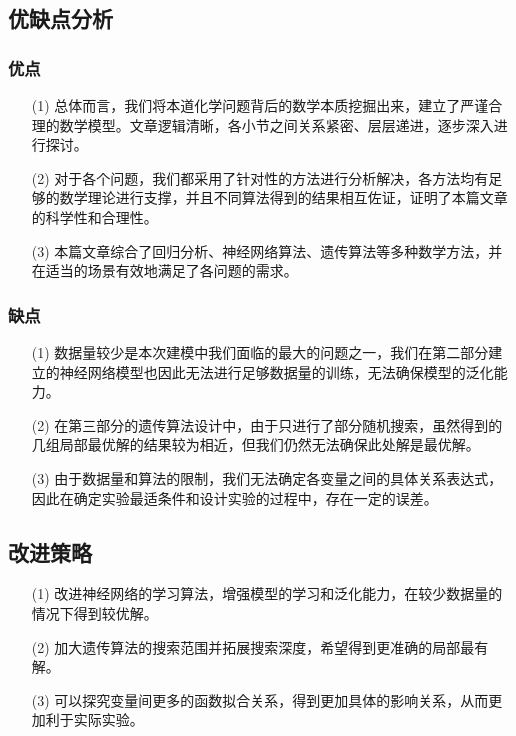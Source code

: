 \documentclass{article}
\begin{document}
	\subsection{优缺点分析}
	\subsubsection{优点}
	\begin{itemize}
		\item[(1)]总体而言，我们将本道化学问题背后的数学本质挖掘出来，建立了严谨合理的数学模型。文章逻辑清晰，各小节之间关系紧密、层层递进，逐步深入进行探讨。
		\item[(2)]对于各个问题，我们都采用了针对性的方法进行分析解决，各方法均有足够的数学理论进行支撑，并且不同算法得到的结果相互佐证，证明了本篇文章的科学性和合理性。
		\item[(3)]本篇文章综合了回归分析、神经网络算法、遗传算法等多种数学方法，并在适当的场景有效地满足了各问题的需求。
	\end{itemize}
	
	\subsubsection{缺点}
	\begin{itemize}
		\item[(1)]数据量较少是本次建模中我们面临的最大的问题之一，我们在第二部分建立的神经网络模型也因此无法进行足够数据量的训练，无法确保模型的泛化能力。
		\item[(2)]在第三部分的遗传算法设计中，由于只进行了部分随机搜索，虽然得到的几组局部最优解的结果较为相近，但我们仍然无法确保此处解是最优解。
		\item[(3)]由于数据量和算法的限制，我们无法确定各变量之间的具体关系表达式，因此在确定实验最适条件和设计实验的过程中，存在一定的误差。
	\end{itemize}

	\subsection{改进策略}
	\begin{itemize}
		\item[(1)]改进神经网络的学习算法，增强模型的学习和泛化能力，在较少数据量的情况下得到较优解。
		\item[(2)]加大遗传算法的搜索范围并拓展搜索深度，希望得到更准确的局部最有解。
		\item[(3)]可以探究变量间更多的函数拟合关系，得到更加具体的影响关系，从而更加利于实际实验。
	\end{itemize}
\end{document}
